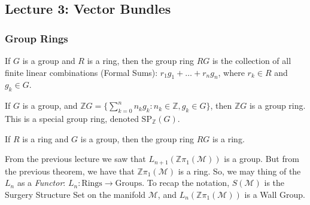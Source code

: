 \documentclass[crop=false,class=book,oneside]{standalone}
\begin{document}
    \subsection{Lecture 3: Vector Bundles}
        \subsubsection{Group Rings}
            \begin{definition}
                If $G$ is a group and $R$ is a ring, then the
                group ring $RG$ is the collection of all
                finite linear combinations (Formal Sums):
                $r_{1}g_{1}+\hdots+r_{n}g_{n}$, where
                $r_{k}\in{R}$ and $g_{k}\in{G}$.
            \end{definition}
            \begin{example}
                If $G$ is a group, and
                $\mathbb{Z}G=\{\sum_{k=0}^{n}n_{k}g_{k}:%
                 n_{k}\in\mathbb{Z},g_{k}\in{G}\}$, then
                $\mathbb{Z}G$ is a group ring. This is a
                special group ring, denoted
                $\textrm{SP}_{\mathbb{Z}}(G)$.
            \end{example}
            \begin{theorem}
                If $R$ is a ring and $G$ is a group, then
                the group ring $RG$ is a ring.
            \end{theorem}
            From the previous lecture we saw that
            $L_{n+1}(\mathbb{Z}\pi_{1}(\mathcal{M}))$ is
            a group. But from the previous theorem, we have
            that $\mathbb{Z}\pi_{1}(\mathcal{M})$ is a ring.
            So, we may thing of the $L_{n}$ as a \textit{Functor}:
            $L_{n}:\textrm{Rings}\rightarrow\textrm{Groups}$.
            To recap the notation, $S(\mathcal{M})$ is the
            Surgery Structure Set on the manifold
            $\mathcal{M}$, and
            $L_{n}(\mathbb{Z}\pi_{1}(\mathcal{M}))$ is
            a Wall Group.
\end{document}
